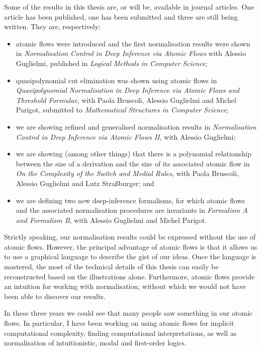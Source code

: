 Some of the results in this thesis are, or will be, available in journal articles. One article has been published, one has been submitted and three are still being written. They are, respectively:
\begin{itemize}
 \item atomic flows were introduced and the first normalisation results were shown in \emph{Normalisation Control in Deep Inference via Atomic Flows} with Alessio Guglielmi, published in \emph{Logical Methods in Computer Science};
 \item quasipolynomial cut elimination was shown using atomic flows in \emph{Quasipolynomial Normalisation in Deep Inference via Atomic Flows and Threshold Formulae}, with Paola Bruscoli, Alessio Guglielmi and Michel Parigot, submitted to \emph{Mathematical Structures in Computer Science};
 \item we are showing refined and generalised normalisation results in \emph{Normalisation Control in Deep Inference via Atomic Flows II}, with Alessio Guglielmi;
 \item we are showing (among other things) that there is a polynomial relationship between the size of a derivation and the size of its associated atomic flow in \emph{On the Complexity of the Switch and Medial Rules}, with Paola Bruscoli, Alessio Guglielmi and Lutz Stra\ss{}burger; and
 \item we are defining two new deep-inference formalisms, for which atomic flows and the associated normalisation procedures are invariants in \emph{Formalism A and Formalism B}, with Alessio Guglielmi and Michel Parigot.
\end{itemize}

Strictly speaking, our normalisation results could be expressed without the use of atomic flows. However, the principal advantage of atomic flows is that it allows us to use a graphical language to describe the gist of our ideas. Once the language is mastered, the most of the technical details of this thesis can easily be reconstructed based on the illustrations alone. Furthermore, atomic flows provide an intuition for working with normalisation, without which we would not have been able to discover our results.

In these three years we could see that many people saw something in our atomic flows. In particular, I have been working on using atomic flows for implicit computational complexity, finding computational interpretations, as well as normalisation of intuitionistic, modal and first-order logics.

